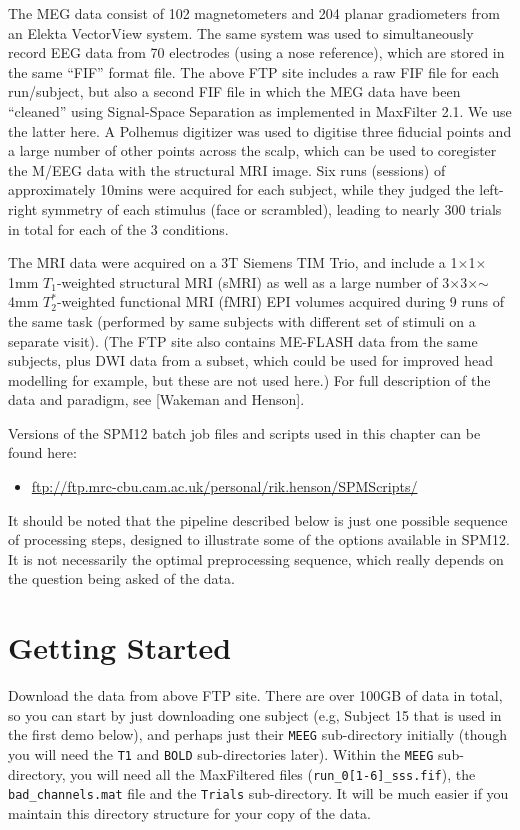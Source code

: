 The MEG data consist of 102 magnetometers and 204 planar gradiometers from an Elekta VectorView system. The same system was used to simultaneously record EEG data from 70 electrodes (using a nose reference), which are stored in the same ``FIF'' format file. The above FTP site includes a raw FIF file for each run/subject, but also a second FIF file in which the MEG data have been ``cleaned'' using Signal-Space Separation as implemented in MaxFilter 2.1. We use the latter here. A Polhemus digitizer was used to digitise three fiducial points and a large number of other points across the scalp, which can be used to coregister the M/EEG data with the structural MRI image. Six runs (sessions) of approximately 10mins were acquired for each subject, while they judged the left-right symmetry of each stimulus (face or scrambled), leading to nearly 300 trials in total for each of the 3 conditions.

The MRI data were acquired on a 3T Siemens TIM Trio, and include a 1\(\times\)1\(\times\)1mm \(T_1\)-weighted structural MRI (sMRI) as well as a large number of 3\(\times\)3\(\times\)\(\sim\)4mm \(T^*_2\)-weighted functional MRI (fMRI) EPI volumes acquired during 9 runs of the same task (performed by same subjects with different set of stimuli on a separate visit). (The FTP site also contains ME-FLASH data from the same subjects, plus DWI data from a subset, which could be used for improved head modelling for example, but these are not used here.) For full description of the data and paradigm, see [Wakeman and Henson].

Versions of the SPM12 batch job files and scripts used in this chapter can be found here:

\begin{itemize}
	\item[] \url{ftp://ftp.mrc-cbu.cam.ac.uk/personal/rik.henson/SPMScripts/}
\end{itemize}

It should be noted that the pipeline described below is just one possible sequence of processing steps, designed to illustrate some of the options available in SPM12. It is not necessarily the optimal preprocessing sequence, which really depends on the question being asked of the data.

\section{Getting Started}

Download the data from above FTP site. There are over 100GB of data in total, so you can start by just downloading one subject (e.g, Subject 15 that is used in the first demo below), and perhaps just their \texttt{MEEG} sub-directory initially (though you will need the \texttt{T1} and \texttt{BOLD} sub-directories later). Within the \texttt{MEEG} sub-directory, you will need all the MaxFiltered files (\texttt{run\_0[1-6]\_sss.fif}), the \texttt{bad\_channels.mat} file and the \texttt{Trials} sub-directory. It will be much easier if you maintain this directory structure for your copy of the data.

